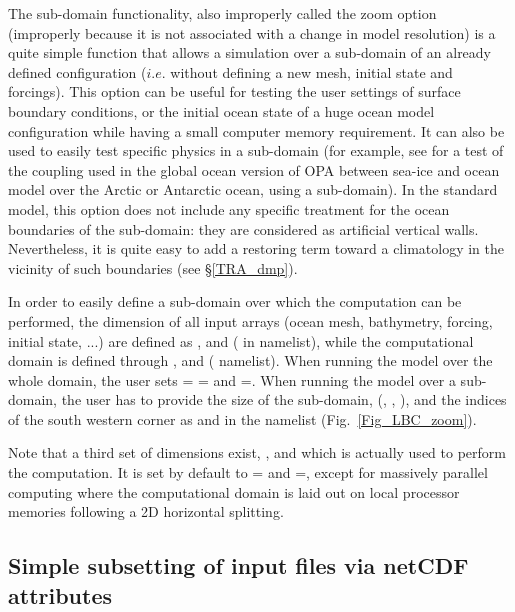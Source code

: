 \documentclass[NEMO_book]{subfiles}
\begin{document}
The sub-domain functionality, also improperly called the zoom option 
(improperly because it is not associated with a change in model resolution) 
is a quite simple function that allows a simulation over a sub-domain of an 
already defined configuration ($i.e.$ without defining a new mesh, initial 
state and forcings). This option can be useful for testing the user settings 
of surface boundary conditions, or the initial ocean state of a huge ocean 
model configuration while having a small computer memory requirement. 
It can also be used to easily test specific physics in a sub-domain (for example, 
see \citep{Madec_al_JPO96} for a test of the coupling used in the global ocean 
version of OPA between sea-ice and ocean model over the Arctic or Antarctic 
ocean, using a sub-domain). In the standard model, this option does not 
include any specific treatment for the ocean boundaries of the sub-domain: 
they are considered as artificial vertical walls. Nevertheless, it is quite easy 
to add a restoring term toward a climatology in the vicinity of such boundaries 
(see \S\ref{TRA_dmp}).

In order to easily define a sub-domain over which the computation can be 
performed, the dimension of all input arrays (ocean mesh, bathymetry, 
forcing, initial state, ...) are defined as ,  and  
( in  namelist), while the computational domain is defined through 
,  and  ( namelist). When running the 
model over the whole domain, the user sets = = 
and =. When running the model over a sub-domain, the user 
has to provide the size of the sub-domain, (, , ), 
and the indices of the south western corner as  and  in 
the   namelist (Fig.~\ref{Fig_LBC_zoom}). 

Note that a third set of dimensions exist, ,  and  which is 
actually used to perform the computation. It is set by default to = 
and =, except for massively parallel computing where the 
computational domain is laid out on local processor memories following a 2D 
horizontal splitting. %

\subsection{Simple subsetting of input files via netCDF attributes}
\end{document}
